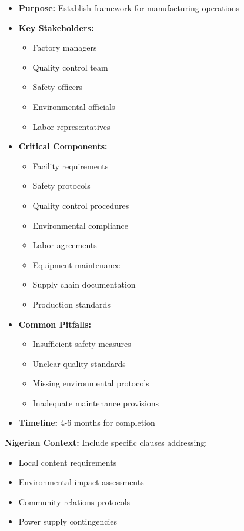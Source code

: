\begin{tcolorbox}[colback=white,colframe=primarydark,title=\textbf{Manufacturing Documentation}]
\begin{itemize}
    \item \textbf{Purpose:} Establish framework for manufacturing operations
    \item \textbf{Key Stakeholders:}
    \begin{itemize}
        \item Factory managers
        \item Quality control team
        \item Safety officers
        \item Environmental officials
        \item Labor representatives
    \end{itemize}
    \item \textbf{Critical Components:}
    \begin{itemize}
        \item Facility requirements
        \item Safety protocols
        \item Quality control procedures
        \item Environmental compliance
        \item Labor agreements
        \item Equipment maintenance
        \item Supply chain documentation
        \item Production standards
    \end{itemize}
    \item \textbf{Common Pitfalls:}
    \begin{itemize}
        \item Insufficient safety measures
        \item Unclear quality standards
        \item Missing environmental protocols
        \item Inadequate maintenance provisions
    \end{itemize}
    \item \textbf{Timeline:} 4-6 months for completion
\end{itemize}

\textbf{Nigerian Context:}
Include specific clauses addressing:
\begin{itemize}
    \item Local content requirements
    \item Environmental impact assessments
    \item Community relations protocols
    \item Power supply contingencies
\end{itemize}
\end{tcolorbox}

